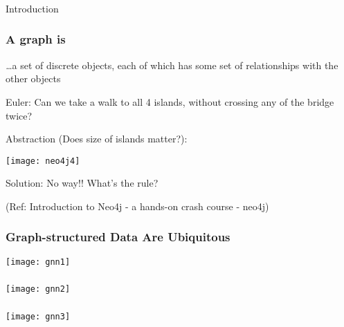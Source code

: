 \begin{frame}[fragile]\frametitle{}
\begin{center}
{\Large Introduction}
\end{center}
\end{frame}


\begin{frame}\frametitle{A graph is}
{\emph \ldots a set of discrete objects, each of which has some set of relationships with the other objects}

Euler: Can we take a walk to all 4 islands, without crossing any of the bridge twice?

Abstraction (Does size of islands matter?):

\begin{center}
\texttt{[image: neo4j4]}
\end{center}	  

Solution: No way!! What's the rule?

{\tiny (Ref: Introduction to Neo4j - a hands-on crash course - neo4j)}
\end{frame}


\begin{frame}[fragile]\frametitle{ Graph-structured Data Are Ubiquitous }

\begin{center}
\texttt{[image: gnn1]}
\end{center}	  

\end{frame}

\begin{frame}[fragile]\frametitle{}

\begin{center}
\texttt{[image: gnn2]}
\end{center}	  

\end{frame}

\begin{frame}[fragile]\frametitle{}

\begin{center}
\texttt{[image: gnn3]}
\end{center}	  

\end{frame}

